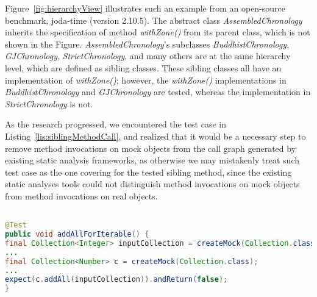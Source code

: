 Figure~\ref{fig:hierarchyView} illustrates such an example from an open-source benchmark, joda-time (version 2.10.5). The abstract class \textit{AssembledChronology} inherits the specification of method \textit{withZone()} from its parent class, which is not shown in the Figure. \textit{AssembledChronology}'s subclasses \textit{BuddhistChronology}, \textit{GJChronology}, \textit{StrictChronology}, and many others are at the same hierarchy level, which are defined as sibling classes. These sibling classes all have an implementation of \textit{withZone()}; however, the \textit{withZone()} implementations in \textit{BuddhistChronology} and \textit{GJChronology} are tested, whereas the implementation in \textit{StrictChronology} is not.

As the research progressed, we encountered the test case in Listing~\ref{lis:siblingMethodCall}, and realized that it would be a necessary step to remove method invocations on mock objects from the call graph generated by existing static analysis frameworks, as otherwise we may mistakenly treat such test case as the one covering for the tested sibling method, since the existing static analyses tools could not distinguish method invocations on mock objects from method invocations on real objects. 

\begin{lstlisting}[basicstyle=\ttfamily, caption={This code snippet illustrates an example from commons-collections4, where the method \textit{addAll()} invoked on the mock object \texttt{c} could be mistreated as a focal method being covered by existing static analysis frameworks.},
basicstyle=\ttfamily,language = Java, framesep=4.5mm, escapechar=|,
framexleftmargin=1.0mm, captionpos=b, label=lis:siblingMethodCall, morekeywords={@Test}]

@Test
public void addAllForIterable() {
final Collection<Integer> inputCollection = createMock(Collection.class);
...
final Collection<Number> c = createMock(Collection.class);
...
expect(c.addAll(inputCollection)).andReturn(false);
}
\end{lstlisting}